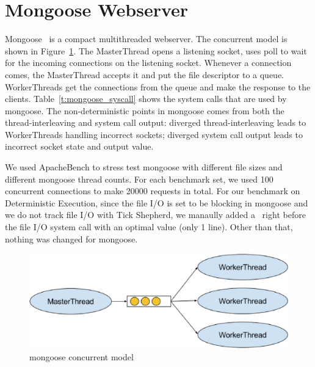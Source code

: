 \section{Mongoose Webserver}  \label{sec:mongoose}

Mongoose~\cite{mongoose} is a compact multithreaded webserver. The concurrent model is shown in Figure~\ref{f:mongoose_model}. The MasterThread opens a listening socket, uses poll to wait for the incoming connections on the listening socket. Whenever a connection comes, the MasterThread accepts it and put the file descriptor to a queue. WorkerThreads get the connections from the queue and make the response to the clients. Table~\ref{t:mongoose_syscall} shows the system calls that are used by mongoose. The non-deterministic points in mongoose comes from both the thread-interleaving and system call output: diverged thread-interleaving leads to WorkerThreads handling incorrect sockets; diverged system call output leads to incorrect socket state and output value.

We used ApacheBench to stress test mongoose with different file sizes and different mongoose thread counts. For each benchmark set, we used 100 concurrent connections to make 20000 requests in total. For our benchmark on Deterministic Execution, since the file I/O is set to be blocking in mongoose and we do not track file I/O with Tick Shepherd, we manaully added a \dettick\ right before the file I/O system call with an optimal value (only 1 line). Other than that, nothing was changed for mongoose.

\begin{figure}
\centering
\includegraphics[width=0.6\columnwidth]{figures/mongoose_model}
\caption{mongoose concurrent model}
\label{f:mongoose_model}
\end{figure}


